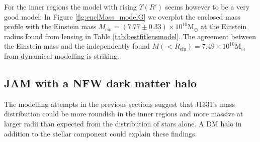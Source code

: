 \documentclass[useAMS,usenatbib]{mnras}
\begin{document}
For the inner regions the model with rising $\Upsilon(R')$ seems however to be a very good model: In Figure \ref{fig:enclMass_modelG} we overplot the enclosed mass profile with the Einstein mass $M_\text{ein} = (7.77 \pm 0.33) \times 10^{10} \text{M}_\odot$ at the Einstein radius found from lensing in Table \ref{tab:bestfitlensmodel}. The agreement between the Einstein mass and the independently found $M(<R_\text{ein}) = 7.49 \times 10^{10} \text{M}_\odot$ from dynamical modelling is striking.

\subsection{JAM with a NFW dark matter halo} \label{sec:results_JAM_NFW}

The modelling attempts in the previous sections suggest that J1331's mass distribution could be more roundish in the inner regions and more massive at larger radii than expected from the distribution of stars alone. A DM halo in addition to the stellar component could explain these findings. 
\end{document}
